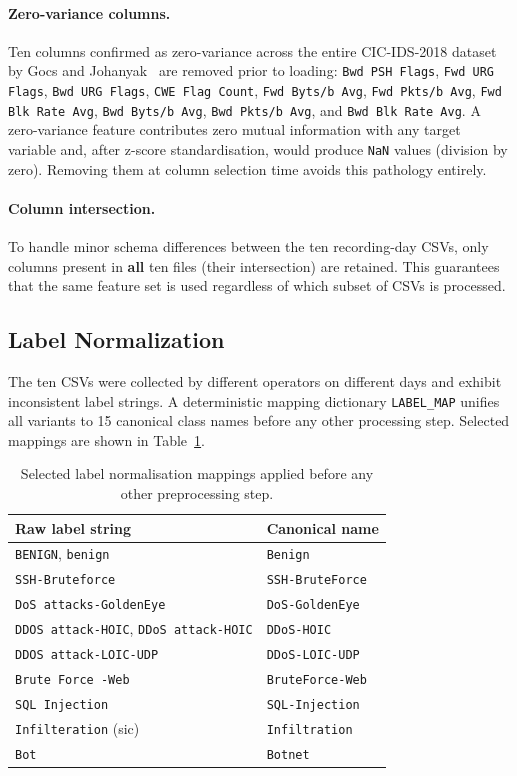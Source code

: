 \documentclass[12pt]{article}
\theoremstyle{plain}
\begin{document}
\paragraph{Zero-variance columns.}
Ten columns confirmed as zero-variance across the entire CIC-IDS-2018 dataset by Gocs and Johanyak~\cite{Gocs2024} are removed prior to loading: \texttt{Bwd PSH Flags}, \texttt{Fwd URG Flags}, \texttt{Bwd URG Flags}, \texttt{CWE Flag Count}, \texttt{Fwd Byts/b Avg}, \texttt{Fwd Pkts/b Avg}, \texttt{Fwd Blk Rate Avg}, \texttt{Bwd Byts/b Avg}, \texttt{Bwd Pkts/b Avg}, and \texttt{Bwd Blk Rate Avg}. A zero-variance feature contributes zero mutual information with any target variable and, after z-score standardisation, would produce \texttt{NaN} values (division by zero). Removing them at column selection time avoids this pathology entirely.

\paragraph{Column intersection.}
To handle minor schema differences between the ten recording-day CSVs, only columns present in \textbf{all} ten files (their intersection) are retained. This guarantees that the same feature set is used regardless of which subset of CSVs is processed.

\subsection{Label Normalization}

The ten CSVs were collected by different operators on different days and exhibit inconsistent label strings. A deterministic mapping dictionary \texttt{LABEL\_MAP} unifies all variants to 15 canonical class names before any other processing step. Selected mappings are shown in Table~\ref{tab:labelmap}.

\begin{table}[H]
\centering
\caption{Selected label normalisation mappings applied before any other preprocessing step.}
\label{tab:labelmap}
\begin{tabular}{ll}
\toprule
\textbf{Raw label string} & \textbf{Canonical name} \\
\midrule
\texttt{BENIGN}, \texttt{benign} & \texttt{Benign} \\
\texttt{SSH-Bruteforce} & \texttt{SSH-BruteForce} \\
\texttt{DoS attacks-GoldenEye} & \texttt{DoS-GoldenEye} \\
\texttt{DDOS attack-HOIC}, \texttt{DDoS attack-HOIC} & \texttt{DDoS-HOIC} \\
\texttt{DDOS attack-LOIC-UDP} & \texttt{DDoS-LOIC-UDP} \\
\texttt{Brute Force -Web} & \texttt{BruteForce-Web} \\
\texttt{SQL Injection} & \texttt{SQL-Injection} \\
\texttt{Infilteration} (sic) & \texttt{Infiltration} \\
\texttt{Bot} & \texttt{Botnet} \\
\bottomrule
\end{tabular}
\end{table}
\end{document}

